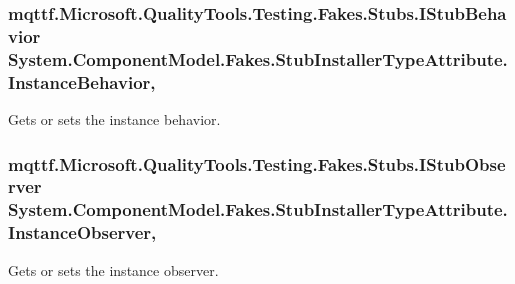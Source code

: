 \hypertarget{class_system_1_1_component_model_1_1_fakes_1_1_stub_installer_type_attribute_a2eb0747135ee6aa6f145861ff5ef7548}{
\subsubsection[{Instance\-Behavior}]{\setlength{\rightskip}{0pt plus 5cm}mqttf.\-Microsoft.\-Quality\-Tools.\-Testing.\-Fakes.\-Stubs.\-I\-Stub\-Behavior System.\-Component\-Model.\-Fakes.\-Stub\-Installer\-Type\-Attribute.\-Instance\-Behavior\hspace{0.3cm}{\ttfamily [get]}, {\ttfamily [set]}}}\label{class_system_1_1_component_model_1_1_fakes_1_1_stub_installer_type_attribute_a2eb0747135ee6aa6f145861ff5ef7548}


Gets or sets the instance behavior.

\hypertarget{class_system_1_1_component_model_1_1_fakes_1_1_stub_installer_type_attribute_af55b6d16011c0322c7610b4b5536c3d5}{
\subsubsection[{Instance\-Observer}]{\setlength{\rightskip}{0pt plus 5cm}mqttf.\-Microsoft.\-Quality\-Tools.\-Testing.\-Fakes.\-Stubs.\-I\-Stub\-Observer System.\-Component\-Model.\-Fakes.\-Stub\-Installer\-Type\-Attribute.\-Instance\-Observer\hspace{0.3cm}{\ttfamily [get]}, {\ttfamily [set]}}}\label{class_system_1_1_component_model_1_1_fakes_1_1_stub_installer_type_attribute_af55b6d16011c0322c7610b4b5536c3d5}


Gets or sets the instance observer.

